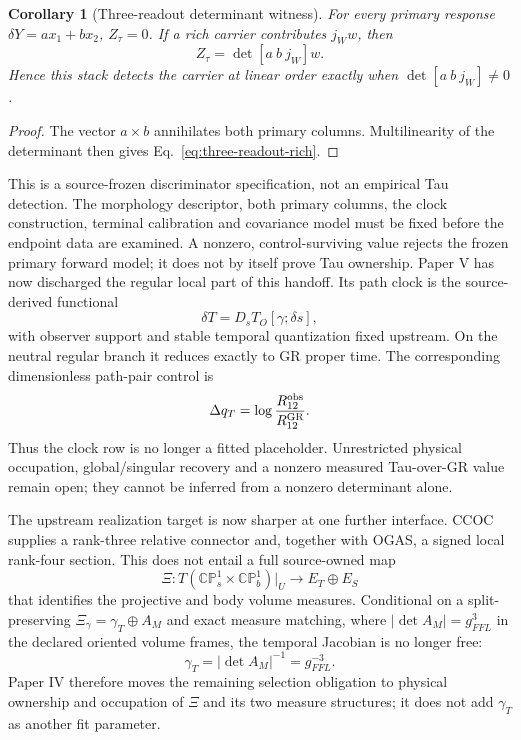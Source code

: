 \documentclass[11pt]{article}
\newtheorem{corollary}{Corollary}
\begin{document}
\begin{corollary}[Three-readout determinant witness]
For every primary response \(\delta Y=ax_1+bx_2\), \(Z_\tau=0\). If a rich
carrier contributes \(j_Ww\), then
\begin{equation}
 Z_\tau=\det[a\ b\ j_W]w.
 \label{eq:three-readout-rich}
\end{equation}
Hence this stack detects the carrier at linear order exactly when
\(\det[a\ b\ j_W]\ne0\).
\end{corollary}

\begin{proof}
The vector \(a\times b\) annihilates both primary columns. Multilinearity of
the determinant then gives Eq.~\eqref{eq:three-readout-rich}.
\end{proof}

This is a source-frozen discriminator specification, not an empirical Tau
detection. The morphology descriptor, both primary columns, the clock
construction, terminal calibration and covariance model must be fixed before
the endpoint data are examined. A nonzero, control-surviving value rejects the
frozen primary forward model; it does not by itself prove Tau ownership. Paper
V has now discharged the regular local part of this handoff. Its path clock is
the source-derived functional
\begin{equation}
 \delta T=D_sT_O[\gamma;\delta s],
 \label{eq:paperv-clock-row-import}
\end{equation}
with observer support and stable temporal quantization fixed upstream. On the
neutral regular branch it reduces exactly to GR proper time. The corresponding
dimensionless path-pair control is
\begin{equation}
 \Delta q_T=\log\frac{R_{12}^{\rm obs}}{R_{12}^{\rm GR}}.
 \label{eq:paperv-time-control-import}
\end{equation}
Thus the clock row is no longer a fitted placeholder. Unrestricted physical occupation,
global/singular recovery and a nonzero measured Tau-over-GR value remain open;
they cannot be inferred from a nonzero determinant alone.

The upstream realization target is now sharper at one further interface.
CCOC supplies a rank-three relative connector and, together with OGAS, a
signed local rank-four section.  This does not entail a full source-owned map
\begin{equation}
 \Xi:T(\mathbb{CP}^{1}_{s}\times\mathbb{CP}^{1}_{b})|_U
 \longrightarrow E_T\oplus E_S
 \label{eq:projective-body-connector-import}
\end{equation}
that identifies the projective and body volume measures.  Conditional on a
split-preserving $\Xi_\gamma=\gamma_T\oplus A_M$ and exact measure matching,
where $|\det A_M|=g_{FFL}^{3}$ in the declared oriented volume frames, the
temporal Jacobian is no longer free:
\begin{equation}
 \gamma_T=|\det A_M|^{-1}=g_{FFL}^{-3}.
 \label{eq:projective-body-scale-import}
\end{equation}
Paper IV therefore moves the remaining selection obligation to physical
ownership and occupation of $\Xi$ and its two measure structures; it does not
add $\gamma_T$ as another fit parameter.
\end{document}
